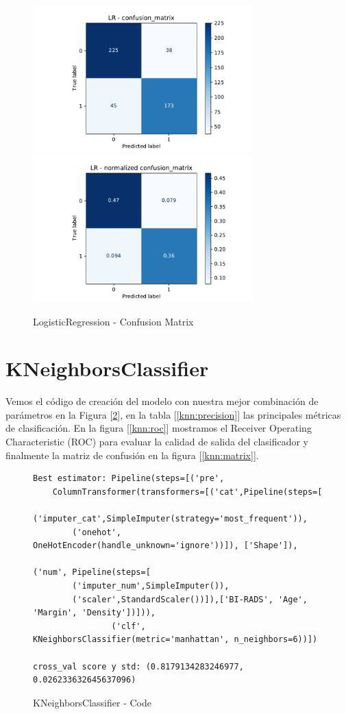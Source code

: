 \documentclass[12pt,twoside]{report}
\begin{document}
\begin{figure}[htp]
\begin{multicols}{2}
\includegraphics[width=8.5cm]{./code/figures_python/confusion_matrix/lr.pdf}%
\columnbreak
\includegraphics[width=8.5cm]{./code/figures_python/confusion_matrix/lr_normalized.pdf}%
\end{multicols}
 \caption{LogisticRegression - Confusion Matrix}
 \label{lr:matrix}
 \end{figure}
 
\section*{KNeighborsClassifier}

Vemos el código de creación del modelo con nuestra mejor combinación de parámetros en la Figura [\ref{knn:code}], en la tabla [\ref{knn:precision}] las principales métricas de clasificación. En la figura [\ref{knn:roc}] mostramos el Receiver Operating Characteristic (ROC) para evaluar la calidad de salida del clasificador y finalmente la matriz de confusión en la figura [\ref{knn:matrix}].

\begin{figure}[ht]
 \begin{lstlisting}
Best estimator: Pipeline(steps=[('pre',
	ColumnTransformer(transformers=[('cat',Pipeline(steps=[
		('imputer_cat',SimpleImputer(strategy='most_frequent')),
		('onehot', OneHotEncoder(handle_unknown='ignore'))]), ['Shape']),
														('num', Pipeline(steps=[
		('imputer_num',SimpleImputer()),
		('scaler',StandardScaler())]),['BI-RADS', 'Age', 'Margin', 'Density'])])),
                ('clf', KNeighborsClassifier(metric='manhattan', n_neighbors=6))])
                
cross_val score y std: (0.8179134283246977, 0.026233632645637096)
 \end{lstlisting}
 \caption{KNeighborsClassifier - Code}
 \label{knn:code}
 \end{figure}
\end{document}
